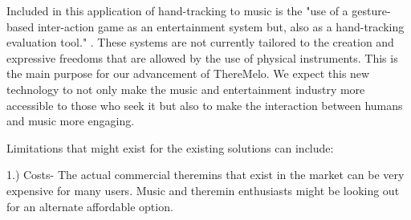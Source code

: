 Included in this application of hand-tracking to music is the "use of a gesture-based inter-action game as an entertainment system but, also as a hand-tracking evaluation tool." \cite{Figueiredo2012}. These systems are not currently tailored to the creation and expressive freedoms that are allowed by the use of physical instruments. This is the main purpose for our advancement of ThereMelo. We expect this new technology to not only make the music and entertainment industry more accessible to those who seek it but also to make the interaction between humans and music more engaging.

Limitations that might exist for the existing solutions can include:

1.) Costs- The actual commercial theremins that exist in the market can be very expensive for many users. Music and theremin enthusiasts might be looking out for an alternate affordable option.


